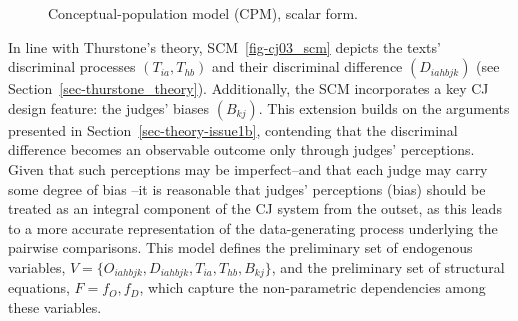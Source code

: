 \documentclass[
  authoryear,
  review,
  1p]{elsarticle}
\begin{document}
\begin{figure}[H]

\begin{minipage}{0.50\linewidth}

\centering{

\[
\begin{aligned}
  O^{cp}_{iahbjk} & := f_{O}(D_{iahbjk}) \\
  D_{iahbjk} & := f_{D}(T_{ia}, T_{hb}, B_{jk})
\end{aligned}
\]

}


\end{minipage}%
%
\begin{minipage}{0.50\linewidth}



\end{minipage}%

\caption{\label{fig-cj03}Conceptual-population model (CPM), scalar
form.}

\end{figure}%

In line with Thurstone's theory, SCM~\ref{fig-cj03_scm} depicts the
texts' discriminal processes \((T_{ia}, T_{hb})\) and their discriminal
difference \((D_{iahbjk})\) (see Section~\ref{sec-thurstone_theory}).
Additionally, the SCM incorporates a key CJ design feature: the judges'
biases \((B_{kj})\). This extension builds on the arguments presented in
Section~\ref{sec-theory-issue1b}, contending that the discriminal
difference becomes an observable outcome only through judges'
perceptions. Given that such perceptions may be imperfect--and that each
judge may carry some degree of bias
\citep[see][]{Pollitt_et_al_2003, vanDaal_et_al_2016}--it is reasonable
that judges' perceptions (bias) should be treated as an integral
component of the CJ system from the outset, as this leads to a more
accurate representation of the data-generating process underlying the
pairwise comparisons. This model defines the preliminary set of
endogenous variables,
\(V = \{ O_{iahbjk}, D_{iahbjk}, T_{ia}, T_{hb}, B_{kj} \}\), and the
preliminary set of structural equations, \(F = { f_{O}, f_{D} }\), which
capture the non-parametric dependencies among these variables.
\end{document}
